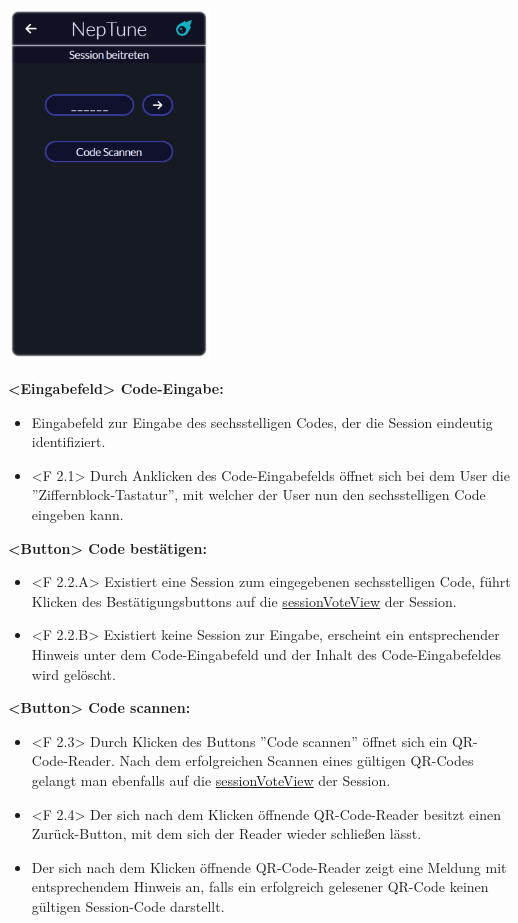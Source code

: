 \documentclass[oneside, ngerman]{sdqtechreport}
\begin{document}
\begin{center}
    \hypertarget{joinSessionView}{}
    \includegraphics[width=0.4\textwidth]{LATEX/Pflichtenheft/GraphicDesigns/userJoinGroupPage.png}
\end{center}

\textbf{<Eingabefeld> Code-Eingabe:}
\begin{itemize}
    \item Eingabefeld zur Eingabe des sechsstelligen Codes, der die Session eindeutig identifiziert.
    \item <F 2.1> Durch Anklicken des Code-Eingabefelds öffnet sich bei dem User die ''Ziffernblock-Tastatur'', mit welcher der User nun den sechsstelligen Code eingeben kann.
\end{itemize}

\textbf{<Button> Code bestätigen:}
\begin{itemize}
    \item <F 2.2.A> Existiert eine Session zum eingegebenen sechsstelligen Code, führt Klicken des Bestätigungsbuttons auf die \hyperlink{sessionVoteView}{sessionVoteView} der Session.
    \item <F 2.2.B> Existiert keine Session zur Eingabe, erscheint ein entsprechender Hinweis unter dem Code-Eingabefeld und der Inhalt des Code-Eingabefeldes wird gelöscht.
\end{itemize}

\textbf{<Button> Code scannen:}
\begin{itemize}
    \item <F 2.3> Durch Klicken des Buttons ''Code scannen'' öffnet sich ein QR-Code-Reader. Nach dem erfolgreichen Scannen eines gültigen QR-Codes gelangt man ebenfalls auf die \hyperlink{sessionVoteView}{sessionVoteView} der Session.
    \item <F 2.4> Der sich nach dem Klicken öffnende QR-Code-Reader besitzt einen Zurück-Button, mit dem sich der Reader wieder schließen lässt.
    \item Der sich nach dem Klicken öffnende QR-Code-Reader zeigt eine Meldung mit entsprechendem Hinweis an, falls ein erfolgreich gelesener QR-Code keinen gültigen Session-Code darstellt.
\end{itemize}
\end{document}
